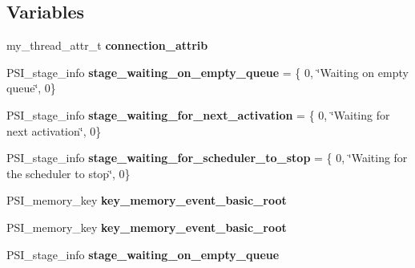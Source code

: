 \subsection*{Variables}
\begin{DoxyCompactItemize}
\item 
\mbox{\label{group__Event__Scheduler_ga0e474aa86af49c32b8e5d9fae2fc676d}} 
my\+\_\+thread\+\_\+attr\+\_\+t {\bfseries connection\+\_\+attrib}
\item 
\mbox{\label{group__Event__Scheduler_gaac6ce480a3d0201037599f8fb6f05862}} 
P\+S\+I\+\_\+stage\+\_\+info {\bfseries stage\+\_\+waiting\+\_\+on\+\_\+empty\+\_\+queue} = \{ 0, \char`\"{}Waiting on empty queue\char`\"{}, 0\}
\item 
\mbox{\label{group__Event__Scheduler_gae2ee0f02026b33aaf16a3e0b0cb5c1d8}} 
P\+S\+I\+\_\+stage\+\_\+info {\bfseries stage\+\_\+waiting\+\_\+for\+\_\+next\+\_\+activation} = \{ 0, \char`\"{}Waiting for next activation\char`\"{}, 0\}
\item 
\mbox{\label{group__Event__Scheduler_gaf3efe154579389be46af2cd9aaba9f54}} 
P\+S\+I\+\_\+stage\+\_\+info {\bfseries stage\+\_\+waiting\+\_\+for\+\_\+scheduler\+\_\+to\+\_\+stop} = \{ 0, \char`\"{}Waiting for the scheduler to stop\char`\"{}, 0\}
\item 
\mbox{\label{group__Event__Scheduler_gafbf61ca89e4ba2534b4fb7ec4be09e32}} 
P\+S\+I\+\_\+memory\+\_\+key {\bfseries key\+\_\+memory\+\_\+event\+\_\+basic\+\_\+root}
\item 
\mbox{\label{group__Event__Scheduler_gafbf61ca89e4ba2534b4fb7ec4be09e32}} 
P\+S\+I\+\_\+memory\+\_\+key {\bfseries key\+\_\+memory\+\_\+event\+\_\+basic\+\_\+root}
\item 
\mbox{\label{group__Event__Scheduler_gaac6ce480a3d0201037599f8fb6f05862}} 
P\+S\+I\+\_\+stage\+\_\+info {\bfseries stage\+\_\+waiting\+\_\+on\+\_\+empty\+\_\+queue}
\item 
\mbox{\label{group__Event__Scheduler_gae2ee0f02026b33aaf16a3e0b0cb5c1d8}} 

\end{DoxyCompactItemize}
